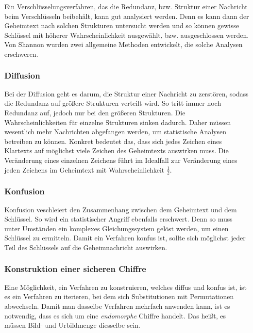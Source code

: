 \documentclass[
10pt, %
a4paper, %
oneside, %
headinclude,footinclude, %
BCOR5mm, %
]{scrartcl}
\begin{document}
	Ein Verschlüsselungsverfahren, das die Redundanz, bzw. Struktur einer Nachricht beim Verschlüsseln beibehält, kann gut analysiert werden. Denn es kann dann der Geheimtext nach solchen Strukturen untersucht werden und so können gewisse Schlüssel mit höherer Wahrscheinlichkeit ausgewählt, bzw. ausgeschlossen werden.  \cite[52]{4} Von Shannon wurden zwei allgemeine Methoden entwickelt, die solche Analysen erschweren.

	\subsubsection{Diffusion}
	Bei der Diffusion geht es darum, die Struktur einer Nachricht zu zerstören, sodass die Redundanz auf größere Strukturen verteilt wird. So tritt immer noch Redundanz auf, jedoch nur bei den größeren Strukturen. Die Wahrscheinlichkeiten für einzelne Strukturen sinken dadurch. Daher müssen wesentlich mehr Nachrichten abgefangen werden, um statistische Analysen betreiben zu können. \cite[53-54]{4} Konkret bedeutet das, dass sich jedes Zeichen eines Klartexts auf möglichst viele Zeichen des Geheimtexts auswirken muss. Die Veränderung eines einzelnen Zeichens führt im Idealfall zur Veränderung eines jeden Zeichens im Geheimtext mit Wahrscheinlichkeit $\frac{1}{2}$. \cite[45]{2} 

	\subsubsection{Konfusion}
	Konfusion veschleiert den Zusammenhang zwischen dem Geheimtext und dem Schlüssel. So wird ein statistischer Angriff ebenfalls erschwert. Denn so muss unter Umständen ein komplexes Gleichungssystem gelöst werden, um einen Schlüssel zu ermitteln. Damit ein Verfahren konfus ist, sollte sich möglichst jeder Teil des Schlüssels auf die Geheimnachricht auswirken. \cite[54-55]{4}
	
	\subsubsection{Konstruktion einer sicheren Chiffre}
	Eine Möglichkeit, ein Verfahren zu konstruieren, welches diffus und konfus ist, ist es ein Verfahren zu iterieren, bei dem sich Substitutionen mit Permutationen abwechseln. Damit man dasselbe Verfahren mehrfach anwenden kann, ist es notwendig, dass es sich um eine \emph{endomorphe} Chiffre handelt. Das heißt, es müssen Bild- und Urbildmenge diesselbe sein. \cite[111]{3}
\end{document}
